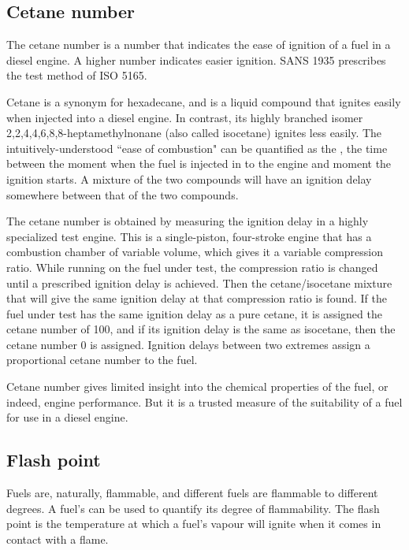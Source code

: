 \subsection{Cetane number}

The cetane number is a number that indicates the ease of ignition of a fuel in a
diesel engine. A higher number indicates easier ignition. SANS 1935 prescribes
the test method of ISO 5165.

Cetane is a synonym for hexadecane, and is a liquid compound that ignites easily
when injected into a diesel engine. In contrast, its highly branched isomer
2,2,4,4,6,8,8-heptamethylnonane (also called isocetane) ignites less easily. The
intuitively-understood ``ease of combustion" can be quantified as the
, the time between the moment when the fuel is injected
in to the engine and moment the ignition starts. A mixture of the two compounds
will have an ignition delay somewhere between that of the two compounds.

The cetane number is obtained by measuring the ignition delay in a  highly
specialized test engine. This is a single-piston, four-stroke engine that has a
combustion chamber of variable volume, which gives it a variable compression
ratio. While running on the fuel under test, the compression ratio is changed
until a prescribed ignition delay is achieved. Then the cetane/isocetane mixture
that will give the same ignition delay at that compression ratio is found. If
the fuel under test has the same ignition delay as a pure cetane, it is assigned
the cetane number of 100, and if its ignition delay is the same as isocetane,
then the cetane number 0 is assigned. Ignition delays between two extremes
assign a proportional cetane number to the fuel.

Cetane number gives limited insight into the chemical properties of the fuel, or
indeed, engine performance. But it is a trusted measure of the suitability of a
fuel for use in a diesel engine. 

\subsection{Flash point}

Fuels are, naturally, flammable, and different fuels are flammable to different
degrees. A fuel's  can be used to quantify its degree of
flammability. The flash point is the temperature at which a fuel's vapour will
ignite when it comes in contact with a flame. 

